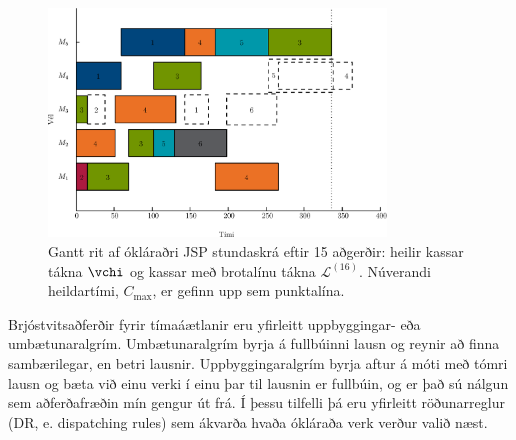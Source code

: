 \documentclass[]{article}
\begin{document}
\begin{figure}\centering
    \includegraphics[width=0.8\textwidth]{figures/jssp_example.eps}
    \caption[Gantt rit af ókláraðri JSP stundaskrá]{Gantt rit af ókláraðri JSP 
    stundaskrá eftir 15 aðgerðir: heilir kassar tákna $\vchi$ og kassar með 
    brotalínu tákna $\mathcal{L}^{(16)}$. 
    Núverandi heildartími, $C_{\max}$, er gefinn upp sem punktalína.}
    \label{fig:jssp:example}
\end{figure}

Brjóstvitsaðferðir fyrir tímaáætlanir eru yfirleitt uppbyggingar- eða 
umbætunaralgrím.
Umbætunaralgrím byrja á fullbúinni lausn og reynir að finna sambærilegar, en 
betri lausnir. 
Uppbyggingaralgrím byrja aftur á móti með tómri lausn og bæta við einu verki í 
einu þar til lausnin er fullbúin, og er það sú nálgun sem aðferðafræðin mín 
gengur út frá. 
Í þessu tilfelli þá eru yfirleitt röðunarreglur (DR, e. dispatching 
rules) sem ákvarða hvaða ókláraða verk verður valið næst. 
\end{document}
